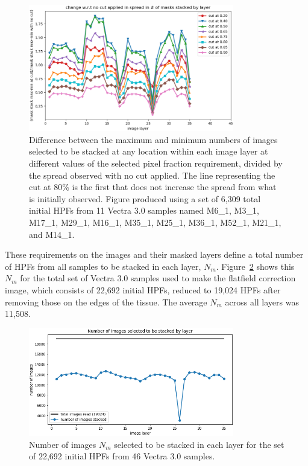 \documentclass[letterpaper,11pt]{article}
\newcommand{\reffig}[1]{Figure~\ref{#1}}
\begin{document}
\begin{figure}[!ht]
\centering
\includegraphics[width=0.80\textwidth]{images/measuring_flatfield_corrections/example_mask_stack_spreads_by_layer}
\caption{\footnotesize Difference between the maximum and minimum numbers of images selected to be stacked at any location within each image layer at different values of the selected pixel fraction requirement, divided by the spread observed with no cut applied. The line representing the cut at 80\% is the first that does not increase the spread from what is initially observed. Figure produced using a set of 6,309 total initial HPFs from 11 Vectra 3.0 samples named M6\_1, M3\_1, M17\_1, M29\_1, M16\_1, M35\_1, M25\_1, M36\_1, M52\_1, M21\_1, and M14\_1.}
\label{fig:selected_pixel_fraction_cut_2}
\end{figure} 

These requirements on the images and their masked layers define a total number of HPFs from all samples to be stacked in each layer, $N_{m}$. \reffig{fig:n_images_stacked_by_layer} shows this $N_{m}$ for the total set of Vectra 3.0 samples used to make the flatfield correction image, which consists of 22,692 initial HPFs, reduced to 19,024 HPFs after removing those on the edges of the tissue. The average $N_{m}$ across all layers was 11,508.

\begin{figure}[!ht]
\centering
\includegraphics[width=0.80\textwidth]{images/measuring_flatfield_corrections/n_images_stacked_per_layer}
\caption{\footnotesize Number of images $N_{m}$ selected to be stacked in each layer for the set of 22,692 initial HPFs from 46 Vectra 3.0 samples.}
\label{fig:n_images_stacked_by_layer}
\end{figure} 
\end{document}
